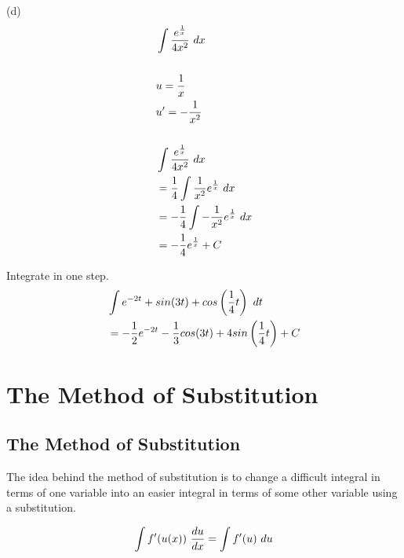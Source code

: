 \begin{exercise}
    (d)
    \begin{align}
         & \int {e^{1 \over x} \over 4x^2} \ dx                 \\
        \\
         & u = {1 \over x}                                      \\
         & u' = -{1 \over x^2}                                  \\
        \\
         & \int {e^{1 \over x} \over 4x^2} \ dx                 \\
         & = {1 \over 4} \int {1 \over x^2}e^{1 \over x} \ dx   \\
         & = -{1 \over 4} \int -{1 \over x^2}e^{1 \over x} \ dx \\
         & = -{1 \over 4}e^{1 \over x} + C
    \end{align}
\end{exercise}

\begin{exercise}\nonumber
    Integrate in one step. \\

    \begin{align}
         & \int e^{-2t} + sin(3t) + cos\left({1 \over 4}t\right) \ dt                     \\
         & = -{1 \over 2}e^{-2t} - {1 \over 3}cos(3t) + 4sin\left({1 \over 4}t\right) + C
    \end{align}
\end{exercise}

\chapter{The Method of Substitution}

\section{The Method of Substitution}

The idea behind the method of substitution is to change a difficult integral in terms of one variable into an easier integral in terms of some other variable using a substitution. \\

\begin{theorem}
    \begin{align}
        \int f'(u(x)) \ {du \over dx} = \int f'(u) \ du
    \end{align}
\end{theorem}

